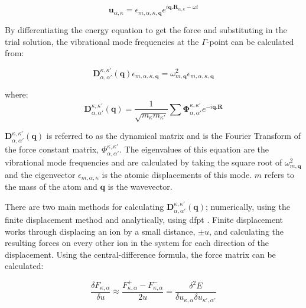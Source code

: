 \begin{equation}
\boldsymbol{u}_{\alpha, \kappa} = \epsilon_{m, \alpha, \kappa, \boldsymbol{q}}e^{i\boldsymbol{q}.\boldsymbol{R}_{\alpha, \kappa} - \omega t}
\end{equation}

By differentiating the energy equation to get the force and substituting in the trial solution, the vibrational mode frequencies at the \(\Gamma\)\nobreakdash-point can be calculated from:

\begin{equation}
\boldsymbol{D}_{\alpha, \alpha'}^{\kappa, \kappa'} (\boldsymbol{q}) \epsilon_{m, \alpha, \kappa, \boldsymbol{q}} = \omega^2_{m,\boldsymbol{q}} \epsilon_{m, \alpha, \kappa, \boldsymbol{q}}
\end{equation}

where:
\begin{equation}
\boldsymbol{D}_{\alpha, \alpha'}^{\kappa, \kappa'} (\boldsymbol{q}) = \frac{1}{\sqrt{m_{\kappa} m_{\kappa'}}} \sum \boldsymbol{\Phi}_{\alpha, \alpha'}^{\kappa, \kappa'} e^{-i\boldsymbol{q}.\boldsymbol{R}}
\end{equation}

\(\boldsymbol{D}_{\alpha, \alpha'}^{\kappa, \kappa'} (\boldsymbol{q})\) is referred to as the dynamical matrix and is the Fourier Transform of the force constant matrix, \(\Phi_{\alpha, \alpha'}^{\kappa, \kappa'}\). The eigenvalues of this equation are the vibrational mode frequencies and are calculated by taking the square root of \(\omega^2_{m,\boldsymbol{q}}\) and the eigenvector \(\epsilon_{m, \alpha, \kappa}\) is the atomic displacements of this mode. \(m\) refers to the mass of the atom and \(\boldsymbol{q}\) is the wavevector.

There are two main methods for calculating \(\boldsymbol{D}_{\alpha, \alpha'}^{\kappa, \kappa'} (\boldsymbol{q})\); numerically, using the finite displacement method and analytically, using \acrfull{dfpt} \cite{Giannozzi2005}. Finite displacement \cite{Kresse1995, Parlinski1997} works through displacing an ion by a small distance, \(\pm u\), and calculating the resulting forces on every other ion in the system for each direction of the displacement. Using the central-difference formula, the force matrix can be calculated:

\begin{equation}
\frac{\delta F_{\kappa, \alpha}}{\delta u} \approx \frac{F_{\kappa, \alpha}^+ - F_{\kappa, \alpha}^-}{2u} = \frac{\delta^2 E}{\delta u_{\kappa, \alpha} \delta u_{\kappa', \alpha'}}
\end{equation}

